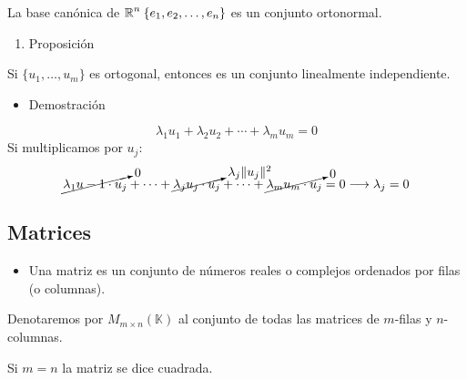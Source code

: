 \Ej

La base canónica de $\operatorname{\mathbb{R}}^n\: \{e_1,e_2,\dots,e_n\}$ es un conjunto ortonormal.
\begin{enumerate}[label=\arabic*)]
	\item Proposición
\end{enumerate}
Si $\{u_1,\dots,u_m\}$ es ortogonal, entonces es un conjunto linealmente independiente.
\begin{itemize}[label=\color{red}\textbullet, leftmargin=*]
	\item \color{lightblue}Demostración
\end{itemize}
\[ \lambda_1u_1+\lambda_2u_2+\cdots+\lambda_mu_m=0 \]
Si multiplicamos por $u_j$:\[ \cancelto{0}{\lambda_1u-1\cdot u_j}+\cdots+\cancelto{\lambda_j\|u_j\|^2}{\lambda_ju_j\cdot u_j}+\cdots+\cancelto{0}{\lambda_mu_m\cdot u_j}=0\longrightarrow\lambda_j=0\]
\subsection{Matrices}
\begin{itemize}[leftmargin=*]
	\item Una matriz es un conjunto de números reales o complejos ordenados por filas (o columnas). 
\end{itemize}
Denotaremos por $M_{m\times n}(\mathbb{K})$ al conjunto de todas las matrices de $m$-filas y $n$-columnas.

Si $m=n$ la matriz se dice cuadrada.

\Ej

